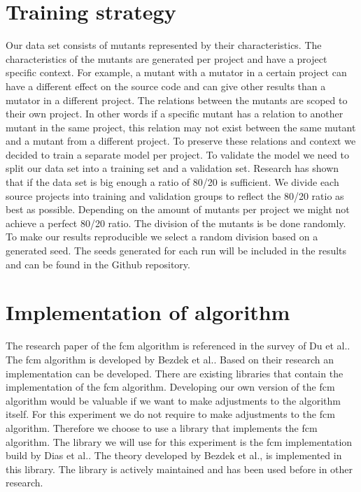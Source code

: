 \documentclass[../../main]{subfiles}
\begin{document}
\section{Training strategy}
\label{ch:training_strategy}
Our data set consists of mutants represented by their characteristics. 
The characteristics of the mutants are generated per project and have a project specific context.
For example, a mutant with a mutator in a certain project can have a different effect on the source code and can give other results than a mutator in a different project.
The relations between the mutants are scoped to their own project. 
In other words if a specific mutant has a relation to another mutant in the same project, this relation may not exist between the same mutant and a mutant from a different project.
To preserve these relations and context we decided to train a separate model per project.
\newline
To validate the model we need to split our data set into a training set and a validation set.
Research has shown that if the data set is big enough a ratio of 80/20 is sufficient\cite{Guyon1997ARatio}.
We divide each source projects into training and validation groups to reflect the 80/20 ratio as best as possible.
Depending on the amount of mutants per project we might not achieve a perfect 80/20 ratio.
The division of the mutants is be done randomly. 
To make our results reproducible we select a random division based on a generated seed.
The seeds generated for each run will be included in the results and can be found in the Github repository\cite{rbasarat-repo}.

\section{Implementation of algorithm}
\label{ch:fcm_implementation}
The research paper of the \acrshort{fcm} algorithm is referenced in the survey of Du et al.\cite{Du2010Clustering:Approach}.
The \acrshort{fcm} algorithm is developed by Bezdek et al.\cite{Bezdek1984FCM:Algorithm}.
Based on their research an implementation can be developed.
There are existing libraries that contain the implementation of the \acrshort{fcm} algorithm.
Developing our own version of the \acrshort{fcm} algorithm would be valuable if we want to make adjustments to the algorithm itself.
For this experiment we do not require to make adjustments to the \acrshort{fcm} algorithm.
Therefore we choose to use a library that implements the \acrshort{fcm} algorithm.
The library we will use for this experiment is the \acrlong{fcm} implementation build by Dias et al.\cite{dias2019fuzzy}.
The theory developed by Bezdek et al., is implemented in this library.
The library is actively maintained and has been used before in other research\cite{DeAlmeidaNeto2020, Kopf2019, Nwadiugwu2020}.
\end{document}
